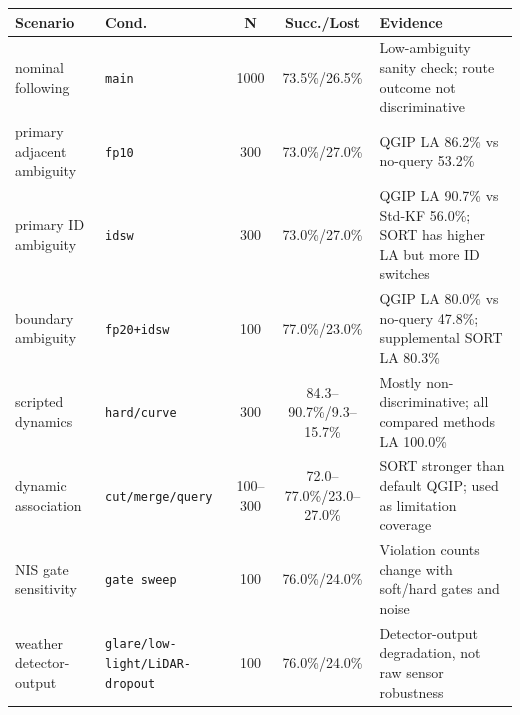 \begin{tabular}{l l c c l}
\toprule
\textbf{Scenario} & \textbf{Cond.} & \textbf{N} & \textbf{Succ./Lost} & \textbf{Evidence} \\
\midrule
nominal following & \texttt{main} & 1000 & 73.5\%/26.5\% & Low-ambiguity sanity check; route outcome not discriminative \\
primary adjacent ambiguity & \texttt{fp10} & 300 & 73.0\%/27.0\% & QGIP LA 86.2\% vs no-query 53.2\% \\
primary ID ambiguity & \texttt{idsw} & 300 & 73.0\%/27.0\% & QGIP LA 90.7\% vs Std-KF 56.0\%; SORT has higher LA but more ID switches \\
boundary ambiguity & \texttt{fp20+idsw} & 100 & 77.0\%/23.0\% & QGIP LA 80.0\% vs no-query 47.8\%; supplemental SORT LA 80.3\% \\
scripted dynamics & \texttt{hard/curve} & 300 & 84.3--90.7\%/9.3--15.7\% & Mostly non-discriminative; all compared methods LA 100.0\% \\
dynamic association & \texttt{cut/merge/query} & 100--300 & 72.0--77.0\%/23.0--27.0\% & SORT stronger than default QGIP; used as limitation coverage \\
NIS gate sensitivity & \texttt{gate sweep} & 100 & 76.0\%/24.0\% & Violation counts change with soft/hard gates and noise \\
weather detector-output & \texttt{glare/low-light/LiDAR-dropout} & 100 & 76.0\%/24.0\% & Detector-output degradation, not raw sensor robustness \\
\bottomrule
\end{tabular}
